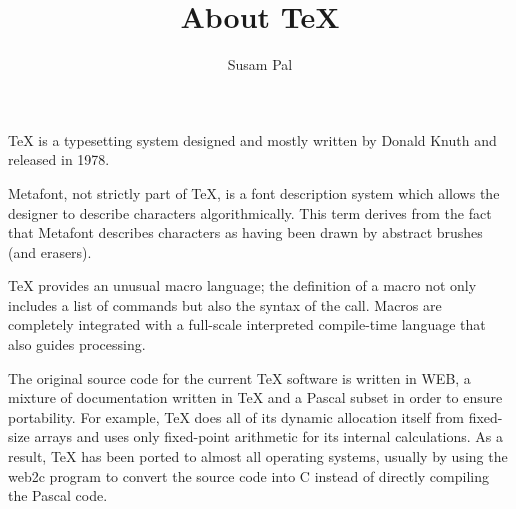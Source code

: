 \documentclass[landscape]{slides}
\author{Susam Pal}
\title{About \TeX}
\begin{document}
\maketitle

%
%


\begin{slide}
\TeX{} is a typesetting system designed and mostly written by Donald
Knuth and released in 1978.
\end{slide}

\begin{slide}
Metafont, not strictly part of \TeX{}, is a font description system
which allows the designer to describe characters algorithmically. This
term derives from the fact that Metafont describes characters as having
been drawn by abstract brushes (and erasers).
\end{slide}

\begin{slide}
\TeX{} provides an unusual macro language; the definition of a macro not
only includes a list of commands but also the syntax of the call. Macros
are completely integrated with a full-scale interpreted compile-time
language that also guides processing.
\end{slide}

\begin{slide}
The original source code for the current \TeX{} software is written in
WEB, a mixture of documentation written in \TeX{} and a Pascal subset in
order to ensure portability. For example, \TeX{} does all of its dynamic
allocation itself from fixed-size arrays and uses only fixed-point
arithmetic for its internal calculations. As a result, \TeX{} has been
ported to almost all operating systems, usually by using the web2c
program to convert the source code into C instead of directly compiling
the Pascal code.
\end{slide}
\end{document}
